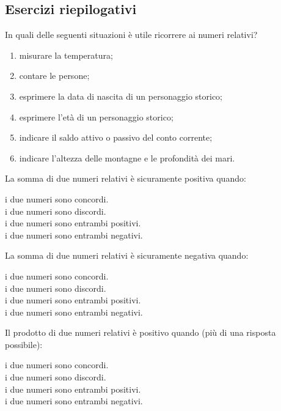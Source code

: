 \subsection{Esercizi riepilogativi}

\begin{esercizio}
In quali delle seguenti situazioni è utile ricorrere ai numeri relativi?
 \begin{enumerate}[noitemsep, label=(\alph*)]
 \item misurare la temperatura;
 \item contare le persone;
 \item esprimere la data di nascita di un personaggio storico;
 \item esprimere l'età di un personaggio storico;
 \item indicare il saldo attivo o passivo del conto corrente;
 \item indicare l'altezza delle montagne e le profondità dei mari.
 \end{enumerate}
\end{esercizio}

\begin{esercizio}
La somma di due numeri relativi è sicuramente positiva quando:
 \begin{multicols}{2}
 \noindent
  \quad i due numeri sono concordi.\\
  \quad i due numeri sono discordi.\\
  \quad i due numeri sono entrambi positivi.\\
  \quad i due numeri sono entrambi negativi.
 \end{multicols}
\end{esercizio}

\begin{esercizio}
La somma di due numeri relativi è sicuramente negativa quando:
 \begin{multicols}{2}
 \noindent
  \quad i due numeri sono concordi.\\
  \quad i due numeri sono discordi.\\
  \quad i due numeri sono entrambi positivi.\\
  \quad i due numeri sono entrambi negativi.
 \end{multicols}
\end{esercizio}

\begin{esercizio}
Il prodotto di due numeri relativi è positivo quando (più di una risposta 
possibile):
 \begin{multicols}{2}
 \noindent
  \quad i due numeri sono concordi.\\
  \quad i due numeri sono discordi.\\
  \quad i due numeri sono entrambi positivi.\\
  \quad i due numeri sono entrambi negativi.
 \end{multicols}
\end{esercizio}

